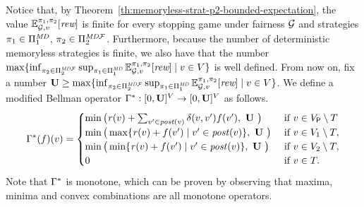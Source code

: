    Notice that,  by Theorem~\ref{th:memoryless-strat-p2-bounded-expectation}, the value $\mathbb{E}^{\pi_{1}, \pi_{2}}_{\mathcal{G},v}[\textit{rew}]$ is finite 
for every stopping game under fairness $\mathcal{G}$ and strategies $\pi_{1} \in \Pi^{\textit{MD}}_{1}$, $\pi_{2} \in \Pi^{\textit{MD}\mathcal{F}}_{2}$. 
 Furthermore, because the number of deterministic memoryless strategies is finite,  we also have that the number 
 $\max \{ \inf_{\pi_{2} \in \Pi^{\textit{MD}\mathcal{F}}_{2}}  \sup_{\pi_{1} \in \Pi^{\textit{MD}}_{1}} \mathbb{E}^{\pi_{1}, \pi_{2}}_{\mathcal{G},v}[\textit{rew}] \mid v \in V \}$ is well defined.  
      From now on,  fix a number $\mathbf{U} \geq \max \{ \inf_{\pi_{2} \in \Pi^{\textit{MD}\mathcal{F}}_{2}}  \sup_{\pi_{1} \in \Pi^{\textit{MD}}_{1}} \mathbb{E}^{\pi_{1}, \pi_{2}}_{\mathcal{G},v}[\textit{rew}] \mid v \in V \}$. We define a modified Bellman operator
$\Gamma^*: [0,\mathbf{U}]^V \rightarrow  [0,\mathbf{U}]^V$ as follows.
\[
    \Bellman(f)(v) =
    \begin{cases}
          \min \big( \reward(v) + \sum_{v' \in \post(v)} \delta(v,v')  f(v'),  \ \UpperBound \ \big ) & \text{ if } v \in V_\Probabilistic \setminus T  \\
          \min\big( \max\{\reward(v)  + f(v') \mid v' \in \post(v) \}, \ \UpperBound  \ \big)& \text{ if } v \in  V_1 \setminus T, \\
          \min\big( \min\{\reward(v)  + f(v') \mid v' \in \post(v) \}, \ \UpperBound \ \big) & \text{ if } v \in  V_2 \setminus T, \\
           0 & \text{ if } v \in T.
    \end{cases}
\]
Note that $\Gamma^*$ is monotone, which can be proven by observing that maxima, minima and convex combinations are all monotone operators.  
